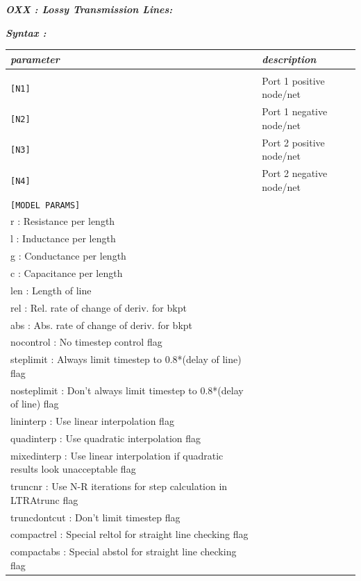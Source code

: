 \textbf{\textit{OXX : Lossy Transmission Lines:}}


\textbf{\textit{Syntax :}}


\begin{longtable}{l l}
\textit{parameter} & \textit{description} \\ \hline \\ \vspace{-0.8\parskip}
\texttt{[N1]} & Port 1 positive node/net \\
\texttt{[N2]} & Port 1 negative node/net \\
\texttt{[N3]} & Port 2 positive node/net \\
\texttt{[N4]} & Port 2 negative node/net \\
\texttt{[MODEL PARAMS]} & \begin{tabular}{lp{5.5cm}p{5cm}}\textit{Model parameters :} \\ 
																					{\small r : Resistance per length} \\ 
																					{\small l : Inductance per length} \\
																					{\small g : Conductance per length} \\
																					{\small c : Capacitance per length} \\
																					{\small len : Length of line} \\
																					{\small rel : Rel. rate of change of deriv. for bkpt} \\
																					{\small abs : Abs. rate of change of deriv. for bkpt} \\
																					{\small nocontrol : No timestep control flag} \\
																					{\small steplimit : Always limit timestep to 0.8*(delay of line) flag} \\
																					{\small nosteplimit : Don't always limit timestep to 0.8*(delay of line) flag} \\
																					{\small lininterp : Use linear interpolation flag} \\
																					{\small quadinterp : Use quadratic interpolation flag} \\
																					{\small mixedinterp : Use linear interpolation if quadratic results look unacceptable flag} \\
																					{\small truncnr : Use N-R iterations for step calculation in LTRAtrunc flag} \\
																					{\small truncdontcut : Don't limit timestep flag} \\
																					{\small compactrel : Special reltol for straight line checking flag} \\
																					{\small compactabs : Special abstol for straight line checking flag} 																					
																					

\end{tabular}
\end{longtable}
